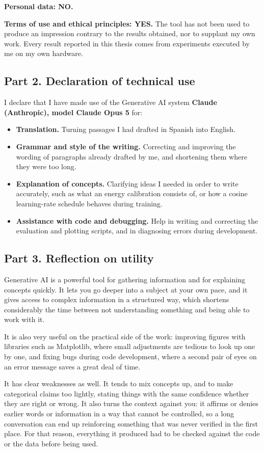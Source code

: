 \documentclass[10pt,conference]{IEEEtran}
\begin{document}
\textbf{Personal data: NO.}

\textbf{Terms of use and ethical principles: YES.} The tool has not been used to
produce an impression contrary to the results obtained, nor to supplant my own
work. Every result reported in this thesis comes from experiments executed by me
on my own hardware.

\subsection*{Part 2. Declaration of technical use}

I declare that I have made use of the Generative AI system \textbf{Claude
(Anthropic), model Claude Opus 5} for:

\begin{itemize}\itemsep3pt \parskip0pt
\item \textbf{Translation.} Turning passages I had drafted in Spanish into
English.

\item \textbf{Grammar and style of the writing.} Correcting and improving the
wording of paragraphs already drafted by me, and shortening them where they
were too long.

\item \textbf{Explanation of concepts.} Clarifying ideas I needed in order to
write accurately, such as what an energy calibration consists of, or how a
cosine learning-rate schedule behaves during training.

\item \textbf{Assistance with code and debugging.} Help in writing and
correcting the evaluation and plotting scripts, and in diagnosing errors during
development.
\end{itemize}

\subsection*{Part 3. Reflection on utility}

Generative AI is a powerful tool for gathering information and for explaining
concepts quickly. It lets you go deeper into a subject at your own pace, and it
gives access to complex information in a structured way, which shortens
considerably the time between not understanding something and being able to work
with it.

It is also very useful on the practical side of the work: improving figures with
libraries such as Matplotlib, where small adjustments are tedious to look up one
by one, and fixing bugs during code development, where a second pair of eyes on
an error message saves a great deal of time.

It has clear weaknesses as well. It tends to mix concepts up, and to make
categorical claims too lightly, stating things with the same confidence whether
they are right or wrong. It also turns the context against you: it affirms or
denies earlier words or information in a way that cannot be controlled, so a
long conversation can end up reinforcing something that was never verified in
the first place. For that reason, everything it produced had to be checked
against the code or the data before being used.
\end{document}

